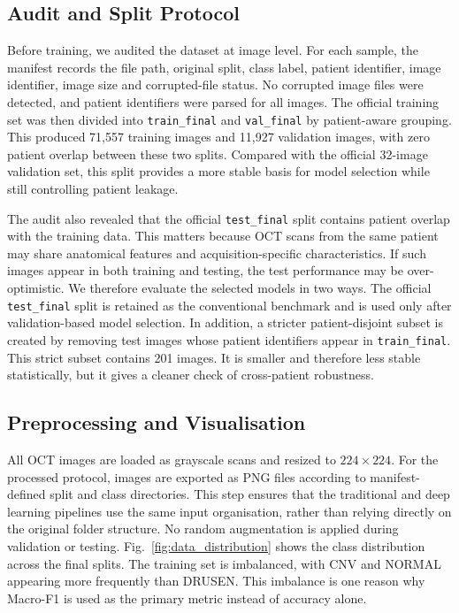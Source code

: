 \documentclass[10pt,twocolumn,letterpaper]{article}
\begin{document}
\subsection{Audit and Split Protocol}
Before training, we audited the dataset at image level. For each sample, the manifest records the file path, original split, class label, patient identifier, image identifier, image size and corrupted-file status. No corrupted image files were detected, and patient identifiers were parsed for all images. The official training set was then divided into \texttt{train\_final} and \texttt{val\_final} by patient-aware grouping. This produced 71,557 training images and 11,927 validation images, with zero patient overlap between these two splits. Compared with the official 32-image validation set, this split provides a more stable basis for model selection while still controlling patient leakage.

The audit also revealed that the official \texttt{test\_final} split contains patient overlap with the training data. This matters because OCT scans from the same patient may share anatomical features and acquisition-specific characteristics. If such images appear in both training and testing, the test performance may be over-optimistic. We therefore evaluate the selected models in two ways. The official \texttt{test\_final} split is retained as the conventional benchmark and is used only after validation-based model selection. In addition, a stricter patient-disjoint subset is created by removing test images whose patient identifiers appear in \texttt{train\_final}. This strict subset contains 201 images. It is smaller and therefore less stable statistically, but it gives a cleaner check of cross-patient robustness.

\subsection{Preprocessing and Visualisation}
All OCT images are loaded as grayscale scans and resized to $224 \times 224$. For the processed protocol, images are exported as PNG files according to manifest-defined split and class directories. This step ensures that the traditional and deep learning pipelines use the same input organisation, rather than relying directly on the original folder structure. No random augmentation is applied during validation or testing. Fig.~\ref{fig:data_distribution} shows the class distribution across the final splits. The training set is imbalanced, with CNV and NORMAL appearing more frequently than DRUSEN. This imbalance is one reason why Macro-F1 is used as the primary metric instead of accuracy alone.
\end{document}
